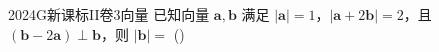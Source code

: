 
\begin{problem}{2024}{G}{新课标II卷}{3}{向量}
已知向量 $\mathbf{a}, \mathbf{b}$ 满足 $|\mathbf{a}|=1$，$|\mathbf{a}+2\mathbf{b}|=2$，且 $(\mathbf{b}-2\mathbf{a})\perp\mathbf{b}$，则 $|\mathbf{b}|=$
(\hspace{1cm})
\begin{choices}
\end{choices}
\end{problem}